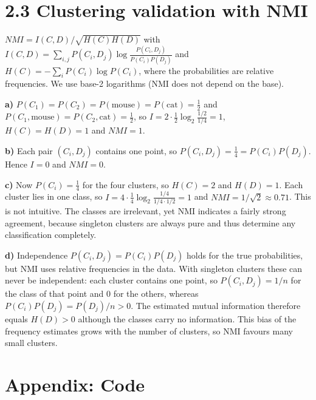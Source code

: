 \documentclass[a4paper,12pt]{article}
\begin{document}
\section*{2.3 Clustering validation with NMI}

$NMI=I(C,D)/\sqrt{H(C)H(D)}$ with $I(C,D)=\sum_{i,j}P(C_i,D_j)\log
\frac{P(C_i,D_j)}{P(C_i)P(D_j)}$ and $H(C)=-\sum_iP(C_i)\log P(C_i)$, where
the probabilities are relative frequencies. We use base-2 logarithms (NMI
does not depend on the base).

\textbf{a)} $P(C_1)=P(C_2)=P(\mathrm{mouse})=P(\mathrm{cat})=\frac12$ and
$P(C_1,\mathrm{mouse})=P(C_2,\mathrm{cat})=\frac12$, so
$I=2\cdot\frac12\log_2\frac{1/2}{1/4}=1$, $H(C)=H(D)=1$ and $NMI=1$.

\textbf{b)} Each pair $(C_i,D_j)$ contains one point, so
$P(C_i,D_j)=\frac14=P(C_i)P(D_j)$. Hence $I=0$ and $NMI=0$.

\textbf{c)} Now $P(C_i)=\frac14$ for the four clusters, so $H(C)=2$ and
$H(D)=1$. Each cluster lies in one class, so
$I=4\cdot\frac14\log_2\frac{1/4}{1/4\cdot1/2}=1$ and
$NMI=1/\sqrt2\approx0.71$. This is not intuitive. The classes are
irrelevant, yet NMI indicates a fairly strong agreement, because singleton
clusters are always pure and thus determine any classification completely.

\textbf{d)} Independence $P(C_i,D_j)=P(C_i)P(D_j)$ holds for the true
probabilities, but NMI uses relative frequencies in the data. With singleton
clusters these can never be independent: each cluster contains one point,
so $P(C_i,D_j)=1/n$ for the class of that point and 0 for the others,
whereas $P(C_i)P(D_j)=P(D_j)/n>0$. The estimated mutual information
therefore equals $H(D)>0$ although the classes carry no information. This
bias of the frequency estimates grows with the number of clusters, so NMI
favours many small clusters.

\section*{Appendix: Code}


\end{document}
